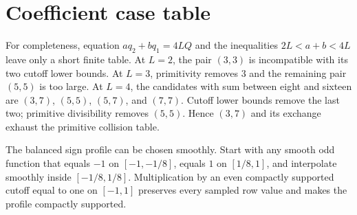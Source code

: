 \section{Coefficient case table}

For completeness, equation $a q_2+b q_1=4LQ$ and the inequalities
$2L<a+b<4L$ leave only a short finite table.  At $L=2$, the pair $(3,3)$ is
incompatible with its two cutoff lower bounds.  At $L=3$, primitivity removes $3$ and
the remaining pair $(5,5)$ is too large.  At $L=4$, the candidates with sum between
eight and sixteen are $(3,7)$, $(5,5)$, $(5,7)$, and $(7,7)$.  Cutoff lower bounds
remove the last two; primitive divisibility removes $(5,5)$.  Hence $(3,7)$ and its
exchange exhaust the primitive collision table.

The balanced sign profile can be chosen smoothly.  Start with any smooth odd function
that equals $-1$ on $[-1,-1/8]$, equals $1$ on $[1/8,1]$, and interpolate smoothly
inside $[-1/8,1/8]$.  Multiplication by an even compactly supported cutoff equal to one
on $[-1,1]$ preserves every sampled row value and makes the profile compactly
supported.
